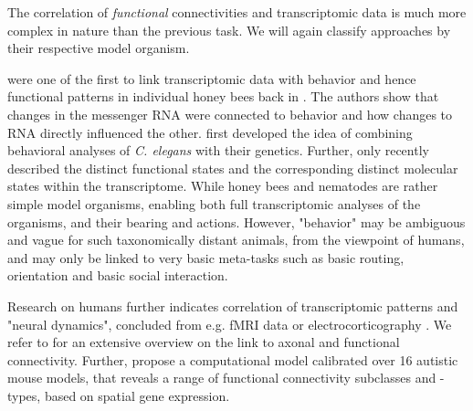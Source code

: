 \documentclass[]{article}
\renewcommand{\cite}{\citep}
\begin{document}
The correlation of \textit{functional} connectivities and transcriptomic data is much more complex in nature than the previous task. We will again classify approaches by their respective model organism.

\citet{whitfield2003gene} were one of the first to link transcriptomic data with behavior and hence functional patterns in individual honey bees back in \citeyear{whitfield2003gene}. The authors show that changes in the messenger RNA were connected to behavior and how changes to RNA directly influenced the other.
\citet{rankin2002gene} first developed the idea of combining behavioral analyses of \textit{C. elegans} with their genetics. Further, \citet{sun2021temporal} only recently described the distinct functional states and the corresponding distinct molecular states within the transcriptome. While honey bees and nematodes are rather simple model organisms, enabling both full transcriptomic analyses of the organisms, and their bearing and actions. However, "behavior" may be ambiguous and vague for such taxonomically distant animals, from the viewpoint of humans, and may only be linked to very basic meta-tasks such as basic routing, orientation and basic social interaction. 

Research on humans further indicates correlation of transcriptomic patterns and "neural dynamics", concluded from e.g. fMRI data \cite{richiardi2015correlated, diez2018neurogenetic, vertes2016gene} or electrocorticography \cite{betzel2019structural}. We refer to \citet{fulcher2021overcoming} for an extensive overview on the link to axonal and functional connectivity. Further, \citet{Zerbi2021} propose a computational model calibrated over 16 autistic mouse models, that reveals a range of functional connectivity subclasses and -types, based on spatial gene expression.\\
\end{document}
